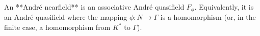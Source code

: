 An **André nearfield** is an associative André quasifield $F_{\phi}$. Equivalently, it is an André quasifield where the mapping $\phi: N \to \Gamma$ is a homomorphism (or, in the finite case, a homomorphism from $K^*$ to $\Gamma$).

